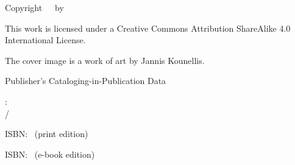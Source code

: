 \bigskip

Copyright\ \textcopyright\ \TheCopyrightYear\ by \TheAuthor

\bigskip

This work is licensed under a Creative Commons Attribution ShareAlike 4.0 International License.

The cover image is a work of art by Jannis Kounellis.

\bigskip

%

\vspace*{5cm}

\bigskip
Publisher's Cataloging-in-Publication Data

\bigskip
\TheAuthorLNF

\TheMainTitle: \\ \hspace*{10mm}\TheSubTitle / \TheAuthorLNF



ISBN: \PrintISBN\, (print edition) 

ISBN: \EbookISBN\, (e-book edition)

%
\bigskip

	\TheEdition


